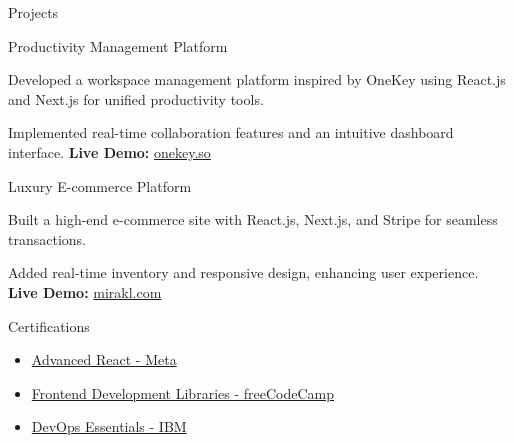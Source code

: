 \documentclass{resume}
\begin{document}
\begin{rSection}{Projects}
\begin{rSubsection}{Productivity Management Platform}{}{}{}
\item Developed a workspace management platform inspired by OneKey using React.js and Next.js for unified productivity tools.
\item Implemented real-time collaboration features and an intuitive dashboard interface. \textbf{Live Demo:} \href{https://onekey.so}{onekey.so}
\end{rSubsection}

\begin{rSubsection}{Luxury E-commerce Platform}{}{}{}
\item Built a high-end e-commerce site with React.js, Next.js, and Stripe for seamless transactions.
\item Added real-time inventory and responsive design, enhancing user experience. \textbf{Live Demo:} \href{https://www.mirakl.com}{mirakl.com}
\end{rSubsection}

\end{rSection}


\begin{rSection}{Certifications}
\begin{itemize}[leftmargin=*]
\item \href{https://www.coursera.org/account/accomplishments/verify/QC73X86DWCRK}{Advanced React - Meta}
\item \href{https://www.freecodecamp.org/certification/fcc36860a3c-366f-4e05-8655-9eeeba048998/front-end-development-libraries}{Frontend Development Libraries - freeCodeCamp}
\item \href{https://www.credly.com/badges/41de71d0-506d-4fc4-98b8-3d72b7d4fd44/linked_in_profile}{DevOps Essentials - IBM}
\end{itemize}
\end{rSection}
\end{document}
